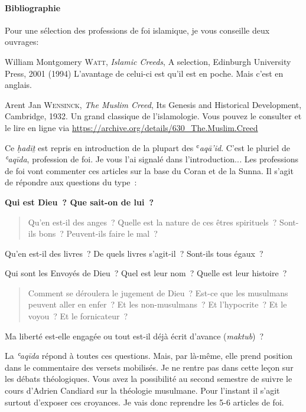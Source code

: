 \paragraph{Bibliographie~} Pour une sélection des professions de foi islamique, je vous conseille deux ouvrages: 

{{William Montgomery \textsc{Watt},
\emph{Islamic Creeds}, A selection, Edinburgh University Press, 2001
(1994) L'avantage de celui-ci est qu'il est en poche. Mais c'est en
anglais.}}

{{Arent Jan W\textsc{ensinck}, \emph{The
Muslim Creed}, Its Genesis and Historical Development, Cambridge, 1932.
Un grand classique de l'islamologie. Vous pouvez le consulter et le lire
en ligne via
\url{https://archive.org/details/630\_The.Muslim.Creed}}}

Ce \emph{ḥadīṯ} est repris en introduction de la plupart des
ʿ\emph{aqā'id}. C'est le pluriel de \emph{ʿaqīda}, profession de foi. Je
vous l'ai signalé dans l'introduction..\emph{.} Les professions de foi
vont commenter ces articles sur la base du Coran et de la Sunna. Il
s'agit de répondre aux questions du type~:

\textbf{Qui est Dieu~? Que sait-on de lui~?}

\begin{quote}
Qu'en est-il des anges~? Quelle est la nature de ces êtres spirituels~?
Sont-ils bons~? Peuvent-ils faire le mal~?
\end{quote}

Qu'en est-il des livres~? De quels livres s'agit-il~? Sont-ils tous
égaux~?

Qui sont les Envoyés de Dieu~? Quel est leur nom~? Quelle est leur
histoire~?

\begin{quote}
Comment se déroulera le jugement de Dieu~? Est-ce que les musulmans
peuvent aller en enfer~? Et les non-musulmans~? Et l'hypocrite~? Et le
voyou~? Et le fornicateur~?
\end{quote}

Ma liberté est-elle engagée ou tout est-il déjà écrit d'avance
(\emph{maktub})~?

La \emph{ʿaqīda} répond à toutes ces questions. Mais, par là-même, elle
prend position dans le commentaire des versets mobilisés. Je ne rentre
pas dans cette leçon sur les débats théologiques. Vous avez la
possibilité au second semestre de suivre le cours d'Adrien Candiard sur
la théologie musulmane. Pour l'instant il s'agit surtout d'exposer ces
croyances. Je vais donc reprendre les 5-6 articles de foi.


